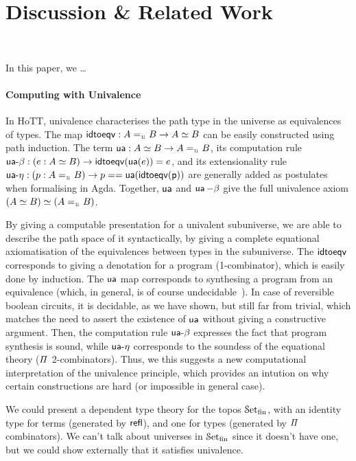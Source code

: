 \section{Discussion \& Related Work}~\label{sec:discussion}

In this paper, we \ldots

\paragraph{Computing with Univalence} In HoTT, univalence characterises the path type in the universe as equivalences of
types. The map $\term{idtoeqv} : A \id_{\UU} B \to A \eqv B$ can be easily constructed using path induction. The term
$\term{ua} : A \eqv B \to A \id_{\UU} B$, its computation rule $\term{ua-\beta} : (e : A \eqv B) \to
    \term{idtoeqv}(\term{ua}(e)) \id e$, and its extensionality rule $\term{ua-\eta} : (p : A \id_{\UU} B) \to p ==
    \term{ua}(\term{idtoeqv(p)})$ are generally added as postulates when formalising in Agda. Together, $\operatorname{\mathsf{ua}}$ and
$\operatorname{\mathsf{ua}}-\beta$ give the full univalence axiom $(A \eqv B) \eqv (A \id_{\UU} B)$.


By giving a computable presentation for a univalent subuniverse, we are able to describe the path space of it
syntactically, by giving a complete equational axiomatisation of the equivalences between types in the subuniverse.
The $\operatorname{\mathsf{idtoeqv}}$ corresponds to giving a denotation for a program (1-combinator), which is easily done by induction.
The $\operatorname{\mathsf{ua}}$ map corresponds to synthesing a program from an equivalence (which, in general, is of course
undecidable~\cite{krogmeierDecidableSynthesisPrograms2020}). In case of reversible boolean circuits, it is decidable, as
we have shown, but still far from trivial, which matches the need to assert the existence of $\operatorname{\mathsf{ua}}$ without giving
a constructive argument. Then, the computation rule $\operatorname{\mathsf{ua-\beta}}$ expresses the fact that program synthesis is
sound, while $\operatorname{\mathsf{ua-\eta}}$ corresponds to the soundess of the equational theory ($\mathit{\Pi}$ 2-combinators). Thus, we
this suggests a new computational interpretation of the univalence principle, which provides an intution on why certain
constructions are hard (or impossible in general case).

We could present a dependent type theory for the topos $\SetFin$, with an identity type for terms (generated by
$\refl$), and one for types (generated by $\mathit{\Pi}$ combinators). We can't talk about universes in $\SetFin$ since it
doesn't have one, but we could show externally that it satisfies univalence.

